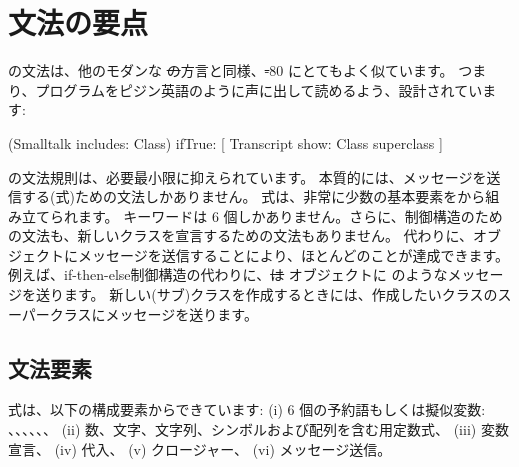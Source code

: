 \documentclass[a4paper,10pt,twoside]{book}
\begin{document}
	\renewcommand{\nnbb}[2]{} %
	\sloppy
\fi
\chapter{文法の要点}



\pharo の文法は、他のモダンな \st の方言と同様、\st-80 にとてもよく似ています。
つまり、プログラムをピジン英語のように声に出して読めるよう、設計されています:

\begin{code}{}
(Smalltalk includes: Class) ifTrue: [ Transcript show: Class superclass ]
\end{code}

\noindent
\pharo の文法規則は、必要最小限に抑えられています。
本質的には、メッセージを送信する(\ie 式)ための文法しかありません。 
式は、非常に少数の基本要素をから組み立てられます。
キーワードは 6 個しかありません。さらに、制御構造のための文法も、新しいクラスを宣言するための文法もありません。
代わりに、オブジェクトにメッセージを送信することにより、ほとんどのことが達成できます。
例えば、if-then-else制御構造の代わりに、\st は  オブジェクトに  のようなメッセージを送ります。
新しい(サブ)クラスを作成するときには、作成したいクラスのスーパークラスにメッセージを送ります。

\section{文法要素}

式は、以下の構成要素からできています:
(i) 6 個の予約語もしくは擬似変数:
、、、、、、
(ii) 数、文字、文字列、シンボルおよび配列を含む用定数式、
(iii) 変数宣言、
(iv) 代入、
(v) クロージャー、
(vi) メッセージ送信。
\end{document}
